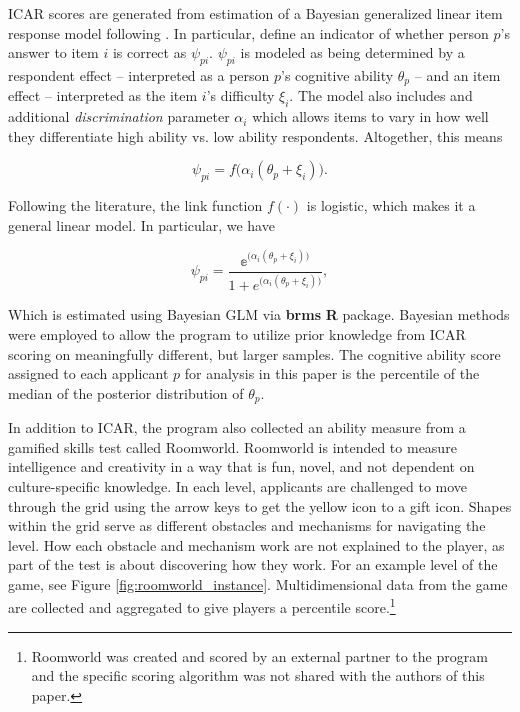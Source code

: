 ICAR scores are generated from estimation of a Bayesian generalized linear item response model following \textcite{burkner2021bayesian}. In particular, define an indicator of whether person $p$'s answer to item $i$ is correct as $\psi_{pi}$. $\psi_{pi}$ is modeled as being determined by a respondent effect -- interpreted as a person $p$'s cognitive ability $\theta_p$ -- and an item effect -- interpreted as the item $i$'s difficulty $\xi_i$. The model also includes and additional \emph{discrimination} parameter $\alpha_i$ which allows items to vary in how well they differentiate high ability vs. low ability respondents. Altogether, this means 

\begin{equation}
\psi_{pi} = f\big(\alpha_i(\theta_p + \xi_i)\big). \nonumber
\end{equation}

Following the literature, the link function $f(\cdot)$ is logistic, which makes it a general linear model. In particular, we have

\begin{equation}
\psi_{pi} = \frac{\mathbb{e}^{\big(\alpha_i(\theta_p + \xi_i)\big)}}{1 + e^{\big(\alpha_i(\theta_p + \xi_i)\big)}}, \nonumber
\end{equation}

Which is estimated using Bayesian GLM via \textbf{brms} \textbf{R} package. Bayesian methods were employed to allow the program to utilize prior knowledge from ICAR scoring on meaningfully different, but larger samples. The cognitive ability score assigned to each applicant $p$ for analysis in this paper is the percentile of the median of the posterior distribution of $\theta_p$.

In addition to ICAR, the program also collected an ability measure from a gamified skills test called Roomworld. Roomworld is intended to measure intelligence and creativity in a way that is fun, novel, and not dependent on culture-specific knowledge. In each level, applicants are challenged to move through the grid using the arrow keys to get the yellow icon to a gift icon. Shapes within the grid serve as different obstacles and mechanisms for navigating the level. How each obstacle and mechanism work are not explained to the player, as part of the test is about discovering how they work. For an example level of the game, see Figure \ref{fig:roomworld_instance}. Multidimensional data from the game are collected and aggregated to give players a percentile score.\footnote{Roomworld was created and scored by an external partner to the program and the specific scoring algorithm was not shared with the authors of this paper.}
 
